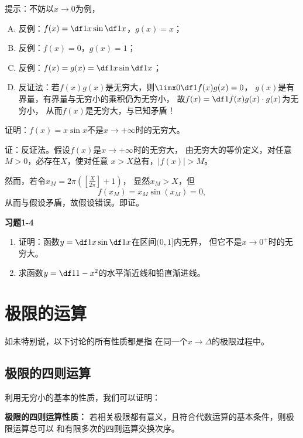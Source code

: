 \ifhint
提示：不妨以$x\to0$为例，
\begin{enumerate}[(A)]
    \setlength{\itemindent}{1cm}
	\item 反例：$f(x)=\df1x\sin\df1x$，$g(x)=x$；
	\item 反例：$f(x)=0$，$g(x)=1$；
	\item 反例：$f(x)=g(x)=\df1x\sin\df1x$；
	\item 反证法：若$f(x)g(x)$是无穷大，则$\limx0\df1{f(x)g(x)}=0$，
	$g(x)$是有界量，有界量与无穷小的乘积仍为无穷小，
	故$f(x)=\df1{f(x)g(x)}\cdot g(x)$为无穷小，
	从而$f(x)$是无穷大，与已知矛盾！\fin
\end{enumerate}
\fi

\bs
\egz 证明：$f(x)=x\sin x$不是$x\to+\infty$时的无穷大。

证：反证法。假设$f(x)$是$x\to+\infty$时的无穷大，
由无穷大的等价定义，对任意$M>0$，必存在$X$，使对任意
$x>X$总有，$|f(x)|>M$。

然而，若令$x_M=2\pi\left(\left[\frac{X}{2\pi}\right]+1\right)$，
显然$x_M>X$，但
$$f(x_M)=x_M\sin(x_M)=0,$$
从而与假设矛盾，故假设错误。即证。\fin

\bs
\begin{ext}
	{\centering\bf 习题1-4}
	
	\begin{enumerate}  
	  \item 证明：函数$y=\df1x\sin\df1x$在区间$(0,1]$内无界，
	  但它不是$x\to 0^+$时的无穷大。
	  \item 求函数$y=\df1{1-x^2}$的水平渐近线和铅直渐进线。
	\end{enumerate}
\end{ext}

\section{极限的运算}

如未特别说，以下讨论的所有性质都是指
在同一个$x\to\Delta$的极限过程中。

\subsection{极限的四则运算}

利用无穷小的基本的性质，我们可以证明：

\begin{thx}
	{\bf 极限的四则运算性质：}
	若相关极限都有意义，且符合代数运算的基本条件，则极限运算总可以
	和有限多次的四则运算交换次序。
\end{thx}

